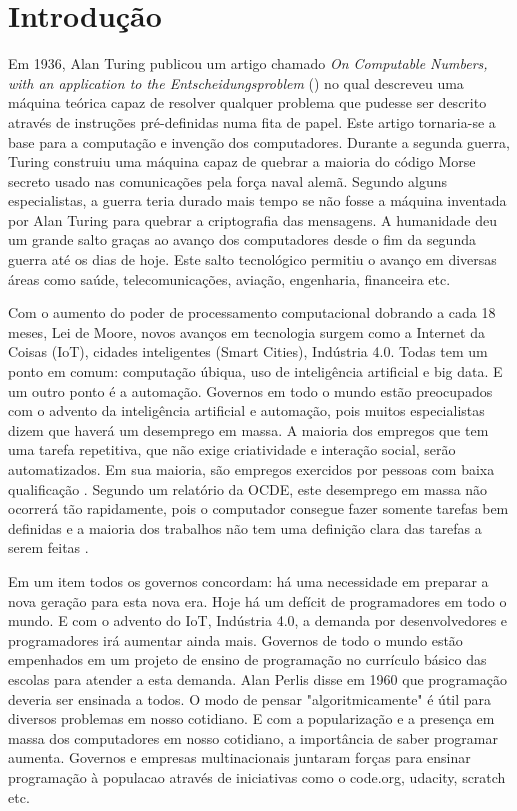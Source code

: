 \chapter{Introdução}
\label{cap:introducao}

Em 1936, Alan Turing publicou um artigo chamado \textit{On Computable Numbers, with an application to the Entscheidungsproblem} (\citeyear{turing1936a}) no qual descreveu uma máquina teórica capaz de resolver qualquer problema que pudesse ser descrito através de instruções pré-definidas numa fita de papel. Este artigo tornaria-se a base para a computação e invenção dos computadores. Durante a segunda guerra, Turing construiu uma máquina capaz de quebrar a maioria do código Morse secreto usado nas comunicações pela força naval alemã.  Segundo alguns especialistas, a guerra teria durado mais tempo se não fosse a máquina inventada por Alan Turing para quebrar a criptografia das mensagens. A humanidade deu um grande salto graças ao avanço dos computadores desde o fim da segunda guerra até os dias de hoje. Este salto tecnológico permitiu o avanço em diversas áreas como saúde, telecomunicações, aviação, engenharia, financeira etc. 

Com o aumento do poder de processamento computacional dobrando a cada 18 meses, Lei de Moore, novos avanços em tecnologia surgem como a Internet da Coisas (IoT), cidades inteligentes (Smart Cities), Indústria 4.0. Todas tem um ponto em comum: computação úbiqua, uso de inteligência artificial e big data. E um outro ponto é a automação. Governos em todo o mundo estão preocupados com o advento da inteligência artificial e automação, pois muitos especialistas dizem que haverá um desemprego em massa. A maioria dos empregos que tem uma tarefa repetitiva, que não exige criatividade e interação social, serão automatizados. Em sua maioria, são empregos exercidos por pessoas com baixa qualificação \citep{europarl:2016}. Segundo um relatório da OCDE, este desemprego em massa não ocorrerá tão rapidamente, pois o computador consegue fazer somente tarefas bem definidas e a maioria dos trabalhos não tem uma definição clara das tarefas a serem feitas \citep{ArntzGregoryZierahn16oecd}.

Em um item todos os governos concordam: há uma necessidade em preparar a nova geração para esta nova era. Hoje há um defícit de programadores em todo o mundo. E com o advento do IoT, Indústria 4.0, a demanda por desenvolvedores e programadores irá aumentar ainda mais. Governos de todo o mundo estão empenhados em um projeto de ensino de programação no currículo básico das escolas para atender a esta demanda. Alan Perlis disse em 1960 que programação deveria ser ensinada a todos. O modo de pensar "algoritmicamente" é útil para diversos problemas em nosso cotidiano. E com a popularização e a presença em massa dos computadores em nosso cotidiano, a importância de saber programar aumenta. Governos e empresas multinacionais juntaram forças para ensinar programação à populacao através de iniciativas como o code.org, udacity, scratch etc.

